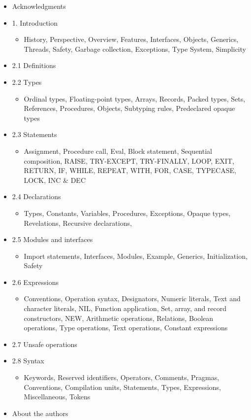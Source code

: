 \documentclass[10pt]{article}
\begin{document}
\begin{itemize}
\item Acknowledgments
\item 1. Introduction
  \begin{itemize}
  \item History, Perspective, Overview, Features, Interfaces, Objects,
    Generics, Threads, Safety, Garbage collection, Exceptions, Type System,
    Simplicity
  \end{itemize}
\item 2.1 Definitions
\item 2.2 Types
  \begin{itemize}
  \item Ordinal types, Floating-point types, Arrays, Records, Packed types,
    Sets, References, Procedures, Objects, Subtyping rules, Predeclared opaque
    types
  \end{itemize}
\item 2.3 Statements
  \begin{itemize}
  \item Assignment, Procedure call, Eval, Block statement, Sequential
    composition, RAISE, TRY-EXCEPT, TRY-FINALLY, LOOP, EXIT, RETURN, IF,
    WHILE, REPEAT, WITH, FOR, CASE, TYPECASE, LOCK, INC \& DEC
  \end{itemize}
\item 2.4 Declarations
  \begin{itemize}
  \item Types, Constants, Variables, Procedures, Exceptions, Opaque types,
    Revelations, Recursive declarations,
  \end{itemize}
\item 2.5 Modules and interfaces
  \begin{itemize}
  \item Import statements, Interfaces, Modules, Example, Generics,
    Initialization, Safety
  \end{itemize}
\item 2.6 Expressions
  \begin{itemize}
  \item Conventions, Operation syntax, Designators, Numeric literals, Text and
    character literals, NIL, Function application, Set, array, and record
    constructors, NEW, Arithmetic operations, Relations, Boolean operations,
    Type operations, Text operations, Constant expressions
  \end{itemize}
\item 2.7 Unsafe operations
\item 2.8 Syntax
  \begin{itemize}
  \item Keywords, Reserved identifiers, Operators, Comments, Pragmas,
    Conventions, Compilation units, Statements, Types, Expressions,
    Miscellaneous, Tokens
  \end{itemize}
\item About the authors
\end{itemize}
\end{document}
